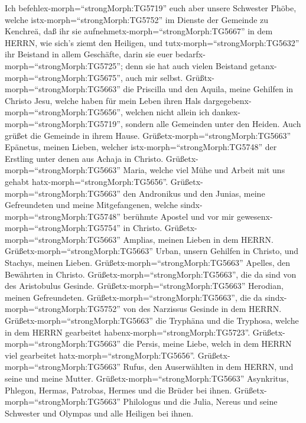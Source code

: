  Ich befehlex-morph=``strongMorph:TG5719'' euch aber unsere
Schwester Phöbe, welche istx-morph=``strongMorph:TG5752'' im Dienste der
Gemeinde zu Kenchreä,  daß ihr sie
aufnehmetx-morph=``strongMorph:TG5667'' in dem HERRN, wie sich's ziemt
den Heiligen, und tutx-morph=``strongMorph:TG5632'' ihr Beistand in
allem Geschäfte, darin sie euer bedarfx-morph=``strongMorph:TG5725'';
denn sie hat auch vielen Beistand getanx-morph=``strongMorph:TG5675'',
auch mir selbst.  Grüßtx-morph=``strongMorph:TG5663'' die
Priscilla und den Aquila, meine Gehilfen in Christo Jesu, 
welche haben für mein Leben ihren Hals
dargegebenx-morph=``strongMorph:TG5656'', welchen nicht allein ich
dankex-morph=``strongMorph:TG5719'', sondern alle Gemeinden unter den
Heiden.  Auch grüßet die Gemeinde in ihrem Hause.
Grüßetx-morph=``strongMorph:TG5663'' Epänetus, meinen Lieben, welcher
istx-morph=``strongMorph:TG5748'' der Erstling unter denen aus Achaja in
Christo.  Grüßetx-morph=``strongMorph:TG5663'' Maria, welche
viel Mühe und Arbeit mit uns gehabt hatx-morph=``strongMorph:TG5656''.
 Grüßetx-morph=``strongMorph:TG5663'' den Andronikus und den
Junias, meine Gefreundeten und meine Mitgefangenen, welche
sindx-morph=``strongMorph:TG5748'' berühmte Apostel und vor mir
gewesenx-morph=``strongMorph:TG5754'' in Christo. 
Grüßetx-morph=``strongMorph:TG5663'' Amplias, meinen Lieben in dem
HERRN.  Grüßetx-morph=``strongMorph:TG5663'' Urban, unsern
Gehilfen in Christo, und Stachys, meinen Lieben. 
Grüßetx-morph=``strongMorph:TG5663'' Apelles, den Bewährten in Christo.
Grüßetx-morph=``strongMorph:TG5663'', die da sind von des Aristobulus
Gesinde.  Grüßetx-morph=``strongMorph:TG5663'' Herodian,
meinen Gefreundeten. Grüßetx-morph=``strongMorph:TG5663'', die da
sindx-morph=``strongMorph:TG5752'' von des Narzissus Gesinde in dem
HERRN.  Grüßetx-morph=``strongMorph:TG5663'' die Tryphäna
und die Tryphosa, welche in dem HERRN gearbeitet
habenx-morph=``strongMorph:TG5723''.
Grüßetx-morph=``strongMorph:TG5663'' die Persis, meine Liebe, welch in
dem HERRN viel gearbeitet hatx-morph=``strongMorph:TG5656''.
 Grüßetx-morph=``strongMorph:TG5663'' Rufus, den
Auserwählten in dem HERRN, und seine und meine Mutter. 
Grüßetx-morph=``strongMorph:TG5663'' Asynkritus, Phlegon, Hermas,
Patrobas, Hermes und die Brüder bei ihnen. 
Grüßetx-morph=``strongMorph:TG5663'' Philologus und die Julia, Nereus
und seine Schwester und Olympas und alle Heiligen bei ihnen.
